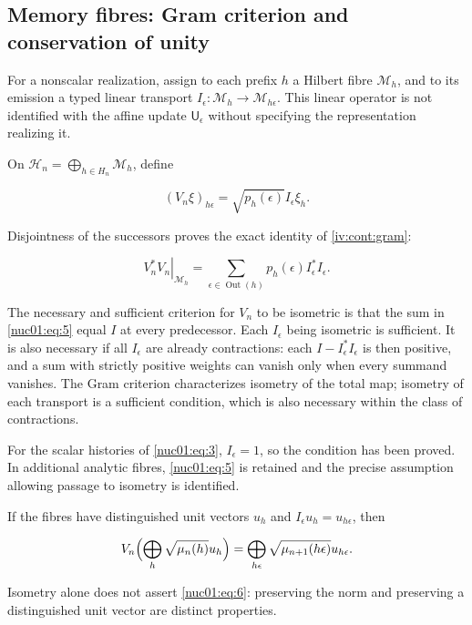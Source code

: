 \subsection{Memory fibres: Gram criterion and conservation of unity}

For a nonscalar realization, assign to each prefix \(h\) a Hilbert fibre \(\mathscr M_h\), and to its emission a typed linear transport
\(I_\epsilon:\mathscr M_h\to\mathscr M_{h\epsilon}\). This linear operator is not identified with the affine update \(\mathsf U_\epsilon\) without specifying the representation realizing it.

On \(\mathscr H_n=\bigoplus_{h\in H_n}\mathscr M_h\), define

\[
(V_n\xi)_{h\epsilon}=\sqrt{p_h(\epsilon)}I_\epsilon\xi_h.
\]

Disjointness of the successors proves the exact identity of \cref{iv:cont:gram}:

\begin{equation}
\left.V_n^*V_n\right|_{\mathscr M_h}
=\sum_{\epsilon\in\operatorname{Out}(h)}p_h(\epsilon)I_\epsilon^*I_\epsilon.
\label{nuc01:eq:5}
\end{equation}

The necessary and sufficient criterion for \(V_n\) to be isometric is that the sum in \eqref{nuc01:eq:5} equal \(I\) at every predecessor. Each \(I_\epsilon\) being isometric is sufficient. It is also necessary if all \(I_\epsilon\) are already contractions: each \(I-I_\epsilon^*I_\epsilon\) is then positive, and a sum with strictly positive weights can vanish only when every summand vanishes. The Gram criterion characterizes isometry of the total map; isometry of each transport is a sufficient condition, which is also necessary within the class of contractions.

For the scalar histories of \eqref{nuc01:eq:3}, \(I_\epsilon=1\), so the condition has been proved. In additional analytic fibres, \eqref{nuc01:eq:5} is retained and the precise assumption allowing passage to isometry is identified.

If the fibres have distinguished unit vectors \(u_h\) and \(I_\epsilon u_h=u_{h\epsilon}\), then

\begin{equation}
V_n\Bigl(\bigoplus_h\sqrt{\mu_n(h)}u_h\Bigr)
=\bigoplus_{h\epsilon}\sqrt{\mu_{n+1}(h\epsilon)}u_{h\epsilon}.
\label{nuc01:eq:6}
\end{equation}

Isometry alone does not assert \eqref{nuc01:eq:6}: preserving the norm and preserving a distinguished unit vector are distinct properties.

